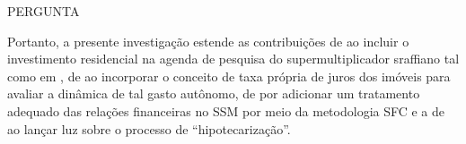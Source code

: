 PERGUNTA

Portanto, a presente investigação estende as contribuições de \textcite{serrano_sraffian_1995} ao incluir o investimento residencial na agenda de pesquisa do supermultiplicador sraffiano tal como em \textcite{da_silveira_investimento_2019}, de \textcite{teixeira_crescimento_2015} ao incorporar o conceito de taxa própria de juros dos imóveis para avaliar a dinâmica de tal gasto autônomo, de \textcite{brochier_supermultiplier_2018} por adicionar um tratamento adequado das relações financeiras no SSM por meio da metodologia SFC 
e a de \textcite{jorda_great_2014} ao lançar luz sobre o processo de ``hipotecarização''. 

